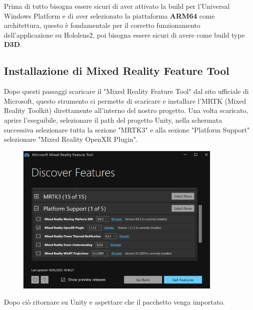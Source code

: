 Prima di tutto bisogna essere sicuri di aver attivato la build per l'Universal Windows Platform e di aver selezionato la piattaforma \textbf{ARM64} come architettura, questo è fondamentale per il corretto funzionamento dell'applicazione su Hololens2, poi bisogna essere sicuri di avere come build type \textbf{D3D}.
\subsection{Installazione di Mixed Reality Feature Tool}
Dopo questi passaggi scaricare il "Mixed Reality Feature Tool" dal sito ufficiale di Microsoft, questo strumento ci permette di scaricare e installare l'MRTK (Mixed Reality Toolkit) direttamente all'interno del nostro progetto. Una volta scaricato, aprire l'eseguibile, selezionare il path del progetto Unity, nella schermata successiva selezionare tutta la sezione "MRTK3" e alla sezione "Platform Support" selezionare "Mixed Reality OpenXR Plugin". 
\begin{figure}[H]
    \centering
    \includegraphics[width=0.9\textwidth,height=\textheight,keepaspectratio]{figures/chapter_1/mixedRealityTool.png}
    \caption{}
\end{figure}
Dopo ciò ritornare su Unity e aspettare che il pacchetto venga importato.
